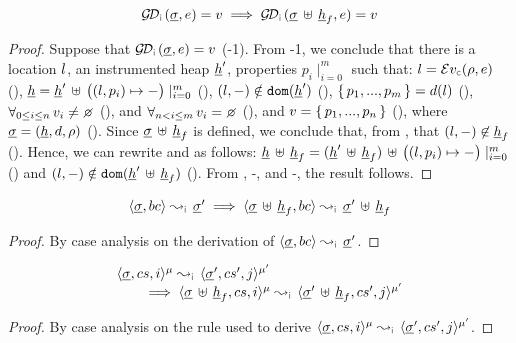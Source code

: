 \begin{lemma}\label{lemma:getdomain:frame}
$$
  \absgetdomainfun{\instrumented}(\istate, \jsilexpr) = \val  
  \implies 
      \absgetdomainfun{\instrumented}(\istate \dunion \iheap_f, \jsilexpr) = \val  
$$
\end{lemma}
\begin{proof}
Suppose that $\absgetdomainfun{\instrumented}(\istate, \jsilexpr) = \val$ (\hyp{1}). 
From \hyp{1}, we conclude that there is a location $l$, an instrumented heap $\underline{h}'$, 
properties $p_i \mid_{i=0}^m$ such that: 
$\loc = \evalexpr{\concrete}(\store, \jsilexpr)$ (), 
$\underline{h} = \underline{h}' \, \uplus \, \big((l, p_i) \mapsto - \big)\mid_{i = 0}^m$ (), 
$(l,-) \notin \texttt{dom} (\underline{h}')$ (), 
$\{ \, p_1, ..., p_m \, \} = d(l)$ (), 
$\forall_{0 \leq i \leq n} \, \val_i \neq \none$ (), and
$\forall_{n < i \leq m} \, \val_i = \none$ (), 
and $v = \{ \, p_1, ..., p_n \, \}$ (), 
where $\underline{\sigma} =  (\underline{h}, d, \rho)$ (). 
Since $\underline{\sigma} \, \uplus \, \underline{h}_f$ is defined, we conclude that, from , that 
$(l, -) \not\in \underline{h}_f$ (). 
Hence, we can rewrite  and  as follows: 
$\underline{h} \, \uplus \, \underline{h}_f = (\underline{h}' \, \uplus \, \underline{h}_f) \, \uplus \, \big((l, p_i) \mapsto - \big)\mid_{i = 0}^m$ () and 
$(l,-) \notin \texttt{dom} (\underline{h}' \, \uplus \, \underline{h}_f)$ (). 
From  , -, and -, the result follows. 
\end{proof}

\begin{lemma}\label{lemma:frame:basic:commands}
$$
\begin{array}{l}
\absbsemrule{\istate, \bcmd}{\istate'}{\instrumented} 
     \implies 
           \absbsemrule{\istate \dunion \iheap_f, \bcmd}{\istate' \dunion \iheap_f}{\instrumented} 
\end{array}
$$
\end{lemma}
\begin{proof}
By case analysis on the derivation of $\absbsemrule{\istate, \bcmd}{\istate'}{\instrumented}$. 
\end{proof}

\begin{lemma}\label{frame:control:flow:cmds}
$$
\begin{array}{l} 
\abssemrule{\istate, \cs, i}{\istate', \cs', j}{\mode}{\mode'}{\instrumented} \\ \quad \quad
     \implies
        \abssemrule{\istate \dunion \iheap_f, \cs, i}{\istate' \dunion \iheap_f, \cs', j}{\mode}{\mode'}{\instrumented} 
 \end{array}
$$
\end{lemma}
\begin{proof}
By case analysis on the rule used to derive $\abssemrule{\istate, \cs, i}{\istate', \cs', j}{\mode}{\mode'}{\instrumented}$. 
\end{proof}

